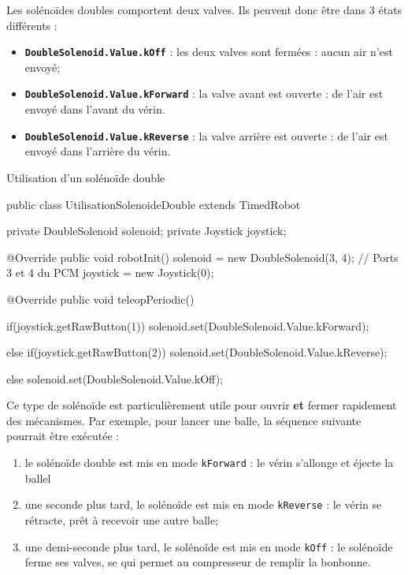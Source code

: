 \documentclass[12pt]{report}
\begin{document}
Les solénoïdes doubles comportent deux valves. Ils peuvent donc être dans 3 états différents :

\begin{itemize}
	\item \texttt{\bfseries DoubleSolenoid.Value.kOff} : les deux valves sont fermées : aucun air n'est envoyé;
	\item \texttt{\bfseries DoubleSolenoid.Value.kForward} : la valve avant est ouverte : de l'air est envoyé dans l'avant du vérin.
	\item \texttt{\bfseries DoubleSolenoid.Value.kReverse} : la valve arrière est ouverte : de l'air est envoyé dans l'arrière du vérin.
\end{itemize}

\begin{MyTCB}{Utilisation d'un solénoïde double}

public class UtilisationSolenoideDouble extends TimedRobot {
	
	private DoubleSolenoid solenoid;
	private Joystick joystick;
	
	@Override
	public void robotInit() {
		solenoid = new DoubleSolenoid(3, 4); // Ports 3 et 4 du PCM
		joystick = new Joystick(0);
	}
	
	@Override
	public void teleopPeriodic() {
	
		if(joystick.getRawButton(1))
			solenoid.set(DoubleSolenoid.Value.kForward);		
			
		else if(joystick.getRawButton(2))
			solenoid.set(DoubleSolenoid.Value.kReverse);
			
		else
			solenoid.set(DoubleSolenoid.Value.kOff);

	}

}

\end{MyTCB}

Ce type de solénoïde est particulièrement utile pour ouvrir \textbf{et} fermer rapidement des mécanismes. Par exemple, pour lancer une balle, la séquence suivante pourrait être exécutée :

\begin{enumerate}
	\item le solénoïde double est mis en mode \texttt{kForward} : le vérin s'allonge et éjecte la ballel
	\item une seconde plus tard, le solénoïde est mis en mode \texttt{kReverse} : le vérin se rétracte, prêt à recevoir une autre balle;
	\item une demi-seconde plus tard, le solénoîde est mis en mode \texttt{kOff} : le solénoïde ferme ses valves, se qui permet au compresseur de remplir la bonbonne.
\end{enumerate}
\end{document}
